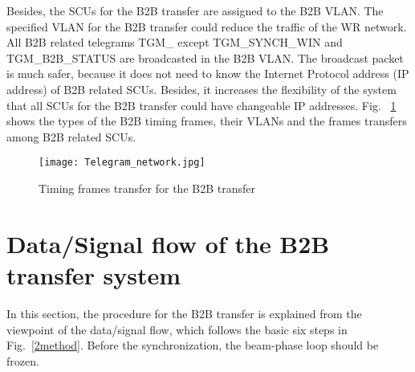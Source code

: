 Besides, the SCUs for the B2B transfer are assigned to the B2B \gls{VLAN}. The specified VLAN for the B2B transfer could reduce the traffic of the WR network. All B2B related telegrams TGM\_ except TGM\_SYNCH\_WIN and TGM\_B2B\_STATUS are broadcasted in the B2B VLAN. The broadcast packet is much safer, because it does not need to know the Internet Protocol address (\gls{IP} address) of B2B related SCUs. Besides, it increases the flexibility of the system that all SCUs for the B2B transfer could have changeable IP addresses. Fig. ~\ref{Telegram_network} shows the types of the B2B timing frames, their VLANs and the frames transfers among B2B related SCUs.
\begin{landscape}
\begin{figure}[!htb]
   \centering   
   \texttt{[image: Telegram\_network.jpg]}
   \caption{Timing frames transfer for the B2B transfer}
   \label{Telegram_network}
\end{figure}  
\end{landscape}
\section{Data/Signal flow of the B2B transfer system}
In this section, the procedure for the B2B transfer is explained from the viewpoint of the data/signal flow, which follows the basic six steps in Fig.~\ref{2method}. Before the synchronization, the beam-phase loop should be frozen. 

